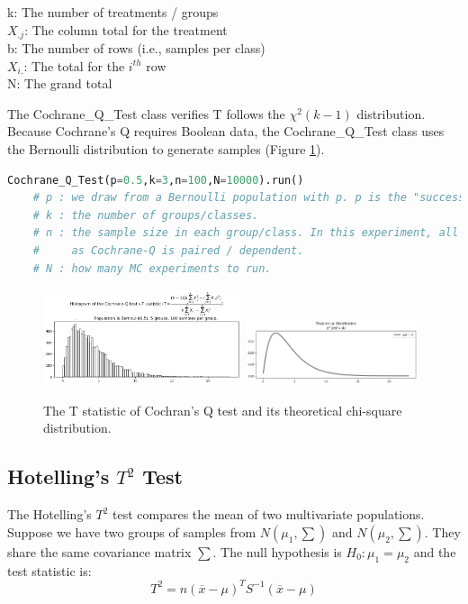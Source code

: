 \documentclass[11pt, letterpaper]{article}
\begin{document}
\noindent k: The number of treatments / groups \\
$X_{.j}$: The column total for the  treatment \\
b: The number of rows (i.e., samples per class) \\
$X_{i.}$: The total for the $i^{th}$ row \\
N: The grand total

The Cochrane\_Q\_Test class verifies T follows the $\chi^2(k-1)$ distribution.
Because Cochrane's Q requires Boolean data, the Cochrane\_Q\_Test class uses the Bernoulli distribution
to generate samples (Figure \ref{fig:Cochran Q mc}).

\lstset{
    basicstyle=\footnotesize,
    xleftmargin=-1em,aboveskip=0.5em,belowskip=0.5em
}
\begin{lstlisting}[language=python]
    Cochrane_Q_Test(p=0.5,k=3,n=100,N=10000).run()
    # p : we draw from a Bernoulli population with p. p is the "success/pass" probability.
    # k : the number of groups/classes.
    # n : the sample size in each group/class. In this experiment, all group sizes are equal,
    #     as Cochrane-Q is paired / dependent.
    # N : how many MC experiments to run.
    \end{lstlisting}

\begin{figure}[htbp]
    \centering
    \vspace{-0.5em}

    \includegraphics[width=0.52\textwidth]{fig15-Cochran Q mc1.png}
    \includegraphics[width=0.45\textwidth]{fig15-Cochran Q mc2.png}
    \caption{The T statistic of Cochran's Q test and its theoretical chi-square distribution.}
    \label{fig:Cochran Q mc}
\end{figure}

\subsection{Hotelling's $T^2$ Test}
The Hotelling's $T^2$ test compares the mean of two multivariate populations.
Suppose we have two groups of samples from $N(\mu_{1},\sum)$ and $N(\mu_{2},\sum)$.
They share the same covariance matrix $\sum$. The null hypothesis is $H_{0}: \mu_{1}=\mu_{2}$
and the test statistic is:
\begin{equation}
    \label{deqn_ex14}
    T^2=n(\overline{x}-\mu)^{T}S^{-1}(\overline{x}-\mu)
\end{equation}
\end{document}

